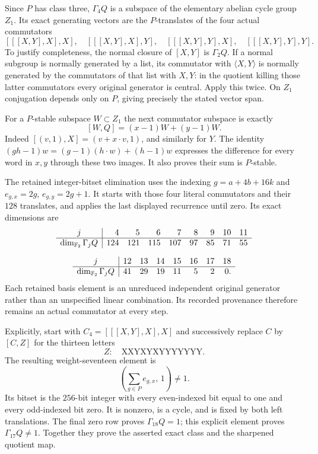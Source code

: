 Since $P$ has class three, $\Gamma_4Q$ is a
subspace of the elementary abelian cycle group
$Z_1$.
Its exact generating vectors are the $P$-translates
of the four actual commutators
\[
 [[[X,Y],X],X],\quad [[[X,Y],X],Y],\quad
 [[[X,Y],Y],X],\quad [[[X,Y],Y],Y].
\]
To justify completeness, the normal closure of
$[X,Y]$ is $\Gamma_2Q$.
If a normal subgroup is normally generated by
a list, its commutator with $\langle X,Y\rangle$
is normally generated by the commutators of
that list with $X,Y$: in the quotient killing
those latter commutators every original
generator is central.
Apply this twice.
On $Z_1$ conjugation depends only on $P$,
giving precisely the stated vector span.

For a $P$-stable subspace $W\subset Z_1$ the next
commutator subspace is exactly
\[
                  [W,Q]=(x-1)W+(y-1)W.
\]
Indeed $[(v,1),X]=(v+x\cdot v,1)$, and similarly
for $Y$.
The identity
$(gh-1)w=(g-1)(h\cdot w)+(h-1)w$
expresses the difference for every word in $x,y$
through these two images.
It also proves their sum is $P$-stable.

The retained integer-bitset elimination uses
the indexing
$g=a+4b+16k$ and $e_{g,x}=2g$, $e_{g,y}=2g+1$.
It starts with those four literal commutators
and their $128$ translates, and applies the
last displayed recurrence until zero.
Its exact dimensions are
\[
 \begin{gathered}
 \begin{array}{c|rrrrrrrr}
 j&4&5&6&7&8&9&10&11\\ \hline
 \dim_{\mathbb F_2}\Gamma_jQ&124&121&115&107&97&85&71&55
 \end{array}
 \\[6pt]
 \begin{array}{c|rrrrrrr}
 j&12&13&14&15&16&17&18\\ \hline
 \dim_{\mathbb F_2}\Gamma_jQ&41&29&19&11&5&2&0 .
 \end{array}
 \end{gathered}
\]
Each retained basis element is an unreduced
independent original generator rather than
an unspecified linear combination.
Its recorded provenance therefore remains
an actual commutator at every step.

Explicitly, start with $C_4=[[[X,Y],X],X]$
and successively replace $C$ by $[C,Z]$
for the thirteen letters
\[
                         Z:\quad \mathrm{XXYXYXYYYYYYY}.
\]
The resulting weight-seventeen element is
\[
                    \left(\sum_{g\in P}e_{g,x},\,1\right)\ne1.
\]
Its bitset is the $256$-bit integer with every
even-indexed bit equal to one and every
odd-indexed bit zero.
It is nonzero, is a cycle, and is fixed by
both left translations.
The final zero row proves $\Gamma_{18}Q=1$;
this explicit element proves $\Gamma_{17}Q\ne1$.
Together they prove the asserted exact class and
the sharpened quotient map.

